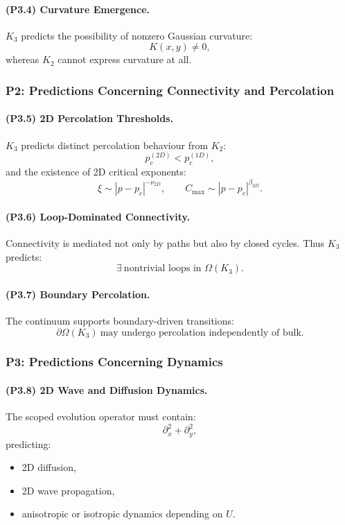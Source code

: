 \paragraph{(P3.4) Curvature Emergence.}
$K_3$ predicts the possibility of nonzero Gaussian curvature:
\[
K(x,y) \neq 0,
\]
whereas $K_2$ cannot express curvature at all.

\subsubsection{P2: Predictions Concerning Connectivity and Percolation}

\paragraph{(P3.5) 2D Percolation Thresholds.}
$K_3$ predicts distinct percolation behaviour from $K_2$:
\[
p_c^{(2D)} < p_c^{(1D)},
\]
and the existence of 2D critical exponents:
\[
\xi \sim |p - p_c|^{-\nu_{2D}},
\qquad
C_{\max} \sim |p - p_c|^{\beta_{2D}}.
\]

\paragraph{(P3.6) Loop-Dominated Connectivity.}
Connectivity is mediated not only by paths but also by closed cycles.  
Thus $K_3$ predicts:
\[
\exists \ \text{nontrivial loops in } \Omega(K_3).
\]

\paragraph{(P3.7) Boundary Percolation.}
The continuum supports boundary-driven transitions:
\[
\partial\Omega(K_3) \ \text{may undergo percolation independently of bulk}.
\]

\subsubsection{P3: Predictions Concerning Dynamics}

\paragraph{(P3.8) 2D Wave and Diffusion Dynamics.}
The scoped evolution operator must contain:
\[
\partial_x^2 + \partial_y^2,
\]
predicting:
\begin{itemize}
    \item 2D diffusion,
    \item 2D wave propagation,
    \item anisotropic or isotropic dynamics depending on $U$.
\end{itemize}


